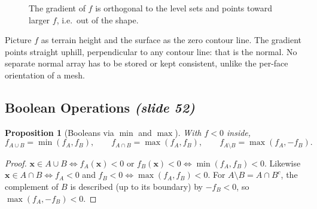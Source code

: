 \documentclass[11pt,a4paper]{article}
\newcommand{\vx}{\bm{x}}
\newcommand{\vn}{\bm{n}}
\newcommand{\norm}[1]{\lVert #1\rVert}
\theoremstyle{definition}
\theoremstyle{plain}
\newtheorem{proposition}[definition]{Proposition}
\theoremstyle{remark}
\newcommand{\slides}[1]{\texorpdfstring{\emph{(#1)}}{(#1)}}
\begin{document}
\begin{figure}[ht]
\centering
{}
\caption{The gradient of $f$ is orthogonal to the level sets and points toward larger $f$, i.e.\ out of the shape.}
\end{figure}

\begin{intuition}
Picture $f$ as terrain height and the surface as the zero contour line. The gradient points straight uphill, perpendicular to any contour line: that is the normal. No separate normal array has to be stored or kept consistent, unlike the per-face orientation of a mesh.
\end{intuition}

\subsection{Boolean Operations \slides{slide 52}}
\begin{proposition}[Booleans via $\min$ and $\max$]
With $f<0$ inside,
\[
f_{A\cup B}=\min(f_A,f_B),\qquad f_{A\cap B}=\max(f_A,f_B),\qquad f_{A\setminus B}=\max(f_A,-f_B).
\]
\end{proposition}
\begin{proof}
$\vx\in A\cup B\iff f_A(\vx)<0$ or $f_B(\vx)<0\iff\min(f_A,f_B)<0$. Likewise $\vx\in A\cap B\iff f_A<0$ and $f_B<0\iff\max(f_A,f_B)<0$. For $A\setminus B=A\cap B^{c}$, the complement of $B$ is described (up to its boundary) by $-f_B<0$, so $\max(f_A,-f_B)<0$.
\end{proof}
\end{document}
